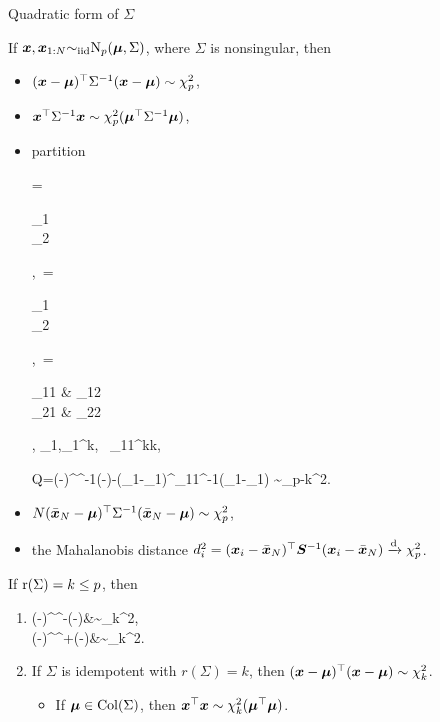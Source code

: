 \documentclass[10pt,a4paper]{book}
\begin{document}
\begin{thmbox}{Quadratic form of $\Sigma$}
	\begin{theorem}\label{thm:quad_MVN}
		If ${\boldsymbol x},{\boldsymbol x}_{1:N}{\sim}_{\mathrm{iid}}\mathrm{N}_p({\boldsymbol\mu},\Sigma)$, where $\Sigma$ is nonsingular, then 
		\begin{itemize}
			\item $({\boldsymbol x}-{\boldsymbol\mu})^\top \Sigma^{-1}({\boldsymbol x}-{\boldsymbol\mu})\sim\chi_p^2$,
			\item ${\boldsymbol x}^\top \Sigma^{-1}{\boldsymbol x}\sim\chi_p^2({\boldsymbol\mu}^\top\Sigma^{-1}{\boldsymbol\mu})$,
			\item partition
			\begin{sequation*}
				\x = \begin{bmatrix}
					\x_1 \\ \x_2
				\end{bmatrix},\ \bam=\begin{bmatrix}
					\bam_1 \\ \bam_2
				\end{bmatrix},\ \Sigma=\begin{bmatrix}
					\Sigma_{11} & \Sigma_{12} \\ \Sigma_{21} & \Sigma_{22}
				\end{bmatrix}, \quad \x_1,\bam_1\in\bbR^{k}, \ \Sigma_{11}\in\bbR^{k\times k}, 
			\end{sequation*} 
			\begin{sequation*}
				Q=(\x-\bam)^\TT \Sigma^{-1}(\x-\bam)-(\x_1-\bam_1)^\TT \Sigma_{11}^{-1}(\x_1-\bam_1) \sim \chi_{p-k}^2.
			\end{sequation*}
			\item $N(\bar{{\boldsymbol x}}_N-{\boldsymbol\mu})^{\top}\Sigma^{-1}(\bar{{\boldsymbol x}}_N-{\boldsymbol\mu})\sim\chi_p^2$,
			\item the Mahalanobis distance
			$d_i^2=(\boldsymbol{x}_i-\bar{\boldsymbol{x}}_N)^{\top}{{\boldsymbol S}}^{-1}(\boldsymbol{x}_i-\bar{\boldsymbol{x}}_N) \xrightarrow{\mathrm{d}} \chi_p^2$.
		\end{itemize} 
		If $\mathrm{r}(\Sigma)=k\leq p$, then 
		\begin{enumerate}
			\item 
			\begin{sequation*}
				\begin{aligned}
					(\x-\bam)^\TT \Sigma^{-}(\x-\bam)&\sim\chi_{k}^2,\\
					(\x-\bam)^\TT \Sigma^{+}(\x-\bam)&\sim\chi_{k}^2.
				\end{aligned}
			\end{sequation*}
			\item If $\Sigma$ is idempotent with $r(\Sigma)=k$, then $({\boldsymbol x}-{\boldsymbol\mu})^\top  ({\boldsymbol x}-{\boldsymbol\mu})\sim\chi_k^2$.  
			\begin{itemize}
				\item If ${\boldsymbol\mu}\in\mathrm{Col}(\Sigma)$, then ${\boldsymbol x}^\top {\boldsymbol x}\sim\chi_k^2({\boldsymbol\mu}^\top {\boldsymbol\mu})$.  
			\end{itemize}
		\end{enumerate}
	\end{theorem}
\end{thmbox}
\end{document}
